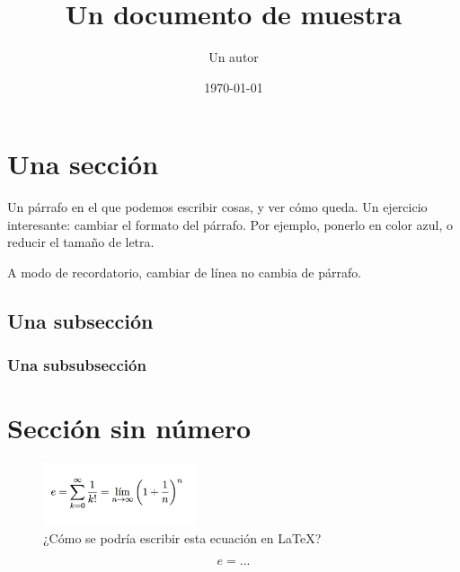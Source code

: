 \documentclass[11pt, a4paper]{article}
\title{Un documento de muestra}
\author{Un autor}
\date{\today}
\begin{document}
\maketitle

\setcounter{tocdepth}{2}

\tableofcontents

\section{Una sección}

Un párrafo en el que podemos escribir cosas, y ver cómo queda. Un ejercicio interesante: cambiar el formato del párrafo. Por ejemplo, ponerlo en color azul, o reducir el tamaño de letra.

A modo de recordatorio,
cambiar de línea
no cambia de párrafo.

\subsection{Una subsección}

\subsubsection{Una subsubsección}

\section*{Sección sin número}

\begin{figure}[hbtp]
\centering
\includegraphics[width = 0.4\textwidth]{Ecuacion.png}
\caption{¿Cómo se podría escribir esta ecuación en \LaTeX?}
\label{fig:ecuacion}
\end{figure}

\[ e = ... \]
\end{document}
